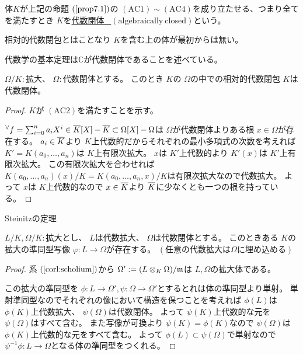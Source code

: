 \documentclass[../master_galois_theory]{subfiles}
\begin{document}
\begin{defi}
  体$K$が上記の命題 $(\mathrm{\ref{prop7.1}})$の $(\mathrm{AC}1) \sim (\mathrm{AC}4)$を成り立たせる、つまり全てを満たすとき
  $K$を\underline{代数閉体 \  $(\mathrm{algebraically \  closed})$}という。

  相対的代数閉包とはことなり $K$を含む上の体が最初からは無い。
\end{defi}

\begin{exam}
  代数学の基本定理は$\mathbb{C}$が代数閉体であることを述べている。
\end{exam}

\begin{prop}
  $\Omega/K:$拡大、 $\Omega :$代数閉体とする。
  このとき $K$の $\Omega$の中での相対的代数閉包 $\overline{K}$は代数閉体。
\end{prop}

\begin{proof}
  $\overline{K}$が $(\mathrm{AC}2)$を満たすことを示す。

  ${}^\forall f = \sum_{i=0}^n a_i X^i \in \overline{K}[X] - \overline{K} \subset \Omega[X] - \Omega$は
  $\Omega$が代数閉体よりある根 $x \in \Omega$が存在する。
  $a_i \in \overline{K}$より $K$上代数的だからそれぞれの最小多項式の次数を考えれば
  $K' = K(a_0 , \dots , a_n)$は $K$上有限次拡大。
  $x$は $K'$上代数的より
  $K'(x)$は $K'$上有限次拡大。
  この有限次拡大を合わせれば $K(a_0 , \dots , a_n)(x)/K = K(a_0 , \dots , a_n , x)/K$は有限次拡大なので代数拡大。
  よって $x$は $K$上代数的なので $x \in \overline{K}$より $\overline{K}$に少なくとも一つの根を持っている。
\end{proof}

\begin{theo}
  \rm{Steinitz}の定理

  $L/K , \Omega/K:$拡大とし、 $L$は代数拡大、 $\Omega$は代数閉体とする。
  このときある $K$の拡大の準同型写像 $\varphi : L \longrightarrow \Omega$が存在する。
  $(任意の代数拡大は \Omega に埋め込める)$
\end{theo}

\begin{proof}
  系 $(\mathrm{\ref{corl:scholium}})$から $\Omega' := (L \otimes_K \Omega)/\mathfrak{m}$は $L , \Omega$の拡大体である。

  この拡大の準同型を $\phi : L \longrightarrow \Omega' , \psi : \Omega \longrightarrow \Omega'$とするとれは体の準同型より単射。
  単射準同型なのでそれぞれの像において構造を保つことを考えれば
  $\phi(L)$は $\phi(K)$上代数拡大、 $\psi(\Omega)$は代数閉体。
  よって $\psi(K)$上代数的な元を $\psi(\Omega)$はすべて含む。
  また写像が可換より $\psi(K) = \phi(K)$なので
  $\psi(\Omega)$は $\phi(K)$上代数的な元をすべて含む。
  よって $\phi(L) \subset \psi(\Omega)$で単射なので
  $\psi^{-1}\phi : L \longrightarrow \Omega$となる体の準同型をつくれる。
\end{proof}
\end{document}
